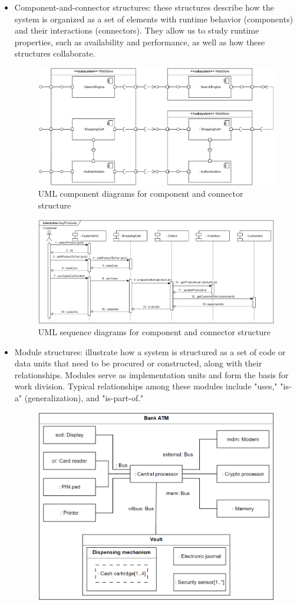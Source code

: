 \begin{itemize}
    \item Component-and-connector structures: these structures describe how the system is organized as a set of elements with runtime behavior (components) and their interactions (connectors). 
        They allow us to study runtime properties, such as availability and performance, as well as how these structures collaborate.
        \begin{figure}[H]
            \centering
            \includegraphics[width=0.75\linewidth]{images/component1.png}
            \caption{UML component diagrams for component and connector structure}
        \end{figure}
        \begin{figure}[H]
            \centering
            \includegraphics[width=0.75\linewidth]{images/component2.png}
            \caption{UML sequence diagrams for component and connector structure}
        \end{figure}
    \item Module structures: illustrate how a system is structured as a set of code or data units that need to be procured or constructed, along with their relationships. 
        Modules serve as implementation units and form the basis for work division.
        Typical relationships among these modules include "uses," "is-a" (generalization), and "is-part-of."
        \begin{figure}[H]
            \centering
            \includegraphics[width=0.75\linewidth]{images/modular1.png}

\end{figure}
\end{itemize}
